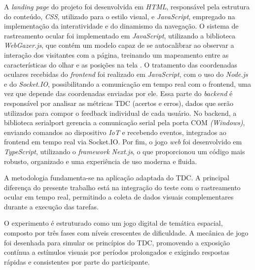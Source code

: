 A \textit{landing page} do projeto foi desenvolvida em \textit{HTML}, responsável pela estrutura do conteúdo, \textit{CSS}, utilizado para o estilo visual, e \textit{JavaScript}, empregado na implementação da interatividade e do dinamismo da navegação. O sistema de rastreamento ocular foi implementado em \textit{JavaScript}, utilizando a biblioteca \textit{WebGazer.js}, que contém um modelo capaz de se autocalibrar ao observar a interação dos visitantes com a página, treinando um mapeamento entre as características do olhar e as posições na tela \cite{papoutsaki2016webgazer}. O tratamento das coordenadas oculares recebidas do \textit{frontend} foi realizado em \textit{JavaScript}, com o uso do \textit{Node.js} e do \textit{Socket.IO}, possibilitando a comunicação em tempo real com o frontend, uma vez que depende das coordenadas enviadas por ele. Essa parte do \textit{backend} é responsável por analisar as métricas TDC (acertos e erros), dados que serão utilizados para compor o feedback individual de cada usuário. No backend, a biblioteca serialport gerencia a comunicação serial pela porta COM \textit{(Windows)}, enviando comandos ao dispositivo \textit{IoT} e recebendo eventos, integrados ao frontend em tempo real via Socket.IO. Por fim, o jogo \textit{web} foi desenvolvido em \textit{TypeScript}, utilizando o \textit{framework} \textit{Next.js}, o que proporcionou um código mais robusto, organizado e uma experiência de uso moderna e fluida.

A metodologia fundamenta-se na aplicação adaptada do TDC. A principal diferença do presente trabalho está na integração do teste com o rastreamento ocular em tempo real, permitindo a coleta de dados visuais complementares durante a execução das tarefas.

O experimento é estruturado como um jogo digital de temática espacial, composto por três fases com níveis crescentes de dificuldade. A mecânica de jogo foi desenhada para simular os princípios do TDC, promovendo a exposição contínua a estímulos visuais por períodos prolongados e exigindo respostas rápidas e consistentes por parte do participante. 

